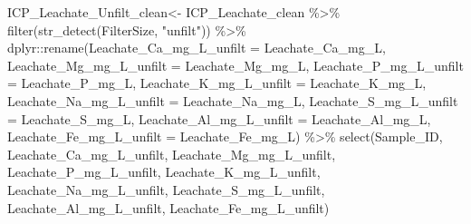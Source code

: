 \documentclass[
]{article}
\newenvironment{Shaded}{\begin{snugshade}}{\end{snugshade}}
\newcommand{\AttributeTok}[1]{\textcolor[rgb]{0.77,0.63,0.00}{#1}}
\newcommand{\FunctionTok}[1]{\textcolor[rgb]{0.00,0.00,0.00}{#1}}
\newcommand{\NormalTok}[1]{#1}
\newcommand{\OtherTok}[1]{\textcolor[rgb]{0.56,0.35,0.01}{#1}}
\newcommand{\SpecialCharTok}[1]{\textcolor[rgb]{0.00,0.00,0.00}{#1}}
\newcommand{\StringTok}[1]{\textcolor[rgb]{0.31,0.60,0.02}{#1}}
\begin{document}
\begin{Shaded}
\begin{Highlighting}[]
\NormalTok{ICP\_Leachate\_Unfilt\_clean}\OtherTok{\textless{}{-}}\NormalTok{ ICP\_Leachate\_clean }\SpecialCharTok{\%\textgreater{}\%}
                \FunctionTok{filter}\NormalTok{(}\FunctionTok{str\_detect}\NormalTok{(FilterSize, }\StringTok{"unfilt"}\NormalTok{)) }\SpecialCharTok{\%\textgreater{}\%}
\NormalTok{  dplyr}\SpecialCharTok{::}\FunctionTok{rename}\NormalTok{(}\AttributeTok{Leachate\_Ca\_mg\_L\_unfilt =} \StringTok{\textquotesingle{}Leachate\_Ca\_mg\_L\textquotesingle{}}\NormalTok{,}
                \AttributeTok{Leachate\_Mg\_mg\_L\_unfilt =} \StringTok{\textquotesingle{}Leachate\_Mg\_mg\_L\textquotesingle{}}\NormalTok{,}
                \AttributeTok{Leachate\_P\_mg\_L\_unfilt =} \StringTok{\textquotesingle{}Leachate\_P\_mg\_L\textquotesingle{}}\NormalTok{,}
                \AttributeTok{Leachate\_K\_mg\_L\_unfilt =} \StringTok{\textquotesingle{}Leachate\_K\_mg\_L\textquotesingle{}}\NormalTok{,}
                \AttributeTok{Leachate\_Na\_mg\_L\_unfilt =} \StringTok{\textquotesingle{}Leachate\_Na\_mg\_L\textquotesingle{}}\NormalTok{,}
                \AttributeTok{Leachate\_S\_mg\_L\_unfilt =} \StringTok{\textquotesingle{}Leachate\_S\_mg\_L\textquotesingle{}}\NormalTok{,}
                \AttributeTok{Leachate\_Al\_mg\_L\_unfilt =} \StringTok{\textquotesingle{}Leachate\_Al\_mg\_L\textquotesingle{}}\NormalTok{,}
                \AttributeTok{Leachate\_Fe\_mg\_L\_unfilt =} \StringTok{\textquotesingle{}Leachate\_Fe\_mg\_L\textquotesingle{}}\NormalTok{) }\SpecialCharTok{\%\textgreater{}\%}
  \FunctionTok{select}\NormalTok{(Sample\_ID, Leachate\_Ca\_mg\_L\_unfilt,  Leachate\_Mg\_mg\_L\_unfilt, Leachate\_P\_mg\_L\_unfilt, Leachate\_K\_mg\_L\_unfilt, Leachate\_Na\_mg\_L\_unfilt, Leachate\_S\_mg\_L\_unfilt, Leachate\_Al\_mg\_L\_unfilt, Leachate\_Fe\_mg\_L\_unfilt)}



\end{Highlighting}
\end{Shaded}
\end{document}
